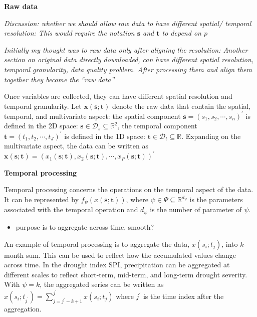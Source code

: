 \documentclass[
]{article}
\providecommand{\tightlist}{%
  \setlength{\itemsep}{0pt}\setlength{\parskip}{0pt}}\usepackage{longtable,booktabs,array}
\begin{document}
\textbf{Raw data}

\emph{Discussion: whether we should allow raw data to have different
spatial/ temporal resolution: This would require the notation
\(\mathbf{s}\) and \(\mathbf{t}\) to depend on \(p\)}

\emph{Initially my thought was to raw data only after aligning the
resolution: Another section on original data directly downloaded, can
have different spatial resolution, temporal granularity, data quality
problem. After processing them and align them together they become the
``raw data''}

Once variables are collected, they can have different spatial resolution
and temporal granularity. Let \(\mathbf{x}(\mathbf{s};\mathbf{t})\)
denote the raw data that contain the spatial, temporal, and multivariate
aspect: the spatial component
\(\mathbf{s} = (s_1, s_2, \cdots, s_n)^\prime\) is defined in the 2D
space: \(\mathbf{s} \in \mathcal{D}_s \subseteq \mathbb{R}^2\), the
temporal component \(\mathbf{t} = (t_1, t_2, \cdots, t_J)^\prime\) is
defined in the 1D space:
\(\mathbf{t} \in \mathcal{D}_t \subseteq \mathbb{R}\). Expanding on the
multivariate aspect, the data can be written as
\(\mathbf{x}(\mathbf{s}; \mathbf{t}) = (x_1(\mathbf{s}; \mathbf{t}), x_2(\mathbf{s}; \mathbf{t}), \cdots, x_P(\mathbf{s}; \mathbf{t}))^\prime\)

\textbf{Temporal processing}

Temporal processing concerns the operations on the temporal aspect of
the data. It can be represented by
\(f_{\mathcal{\psi}}(x(\mathbf{s};\mathbf{t}))\), where
\(\psi \in \Psi \subseteq \mathbb{R}^{d_{\psi}}\) is the parameters
associated with the temporal operation and \(d_{\psi}\) is the number of
parameter of \(\psi\).

\begin{itemize}
\tightlist
\item
  purpose is to aggregate across time, smooth?
\end{itemize}

An example of temporal processing is to aggregate the data,
\(x(s_i; t_j)\), into \(k\)-month sum. This can be used to reflect how
the accumulated values change across time. In the drought index SPI,
precipitation can be aggregated at different scales to reflect
short-term, mid-term, and long-term drought severity. With \(\psi = k\),
the aggregated series can be written as
\(x(s_i;t_{j^\prime}) = \sum_{j = j^\prime-k+1}^{j^\prime}x(s_i; t_j)\)
where \(j^\prime\) is the time index after the aggregation.
\end{document}
